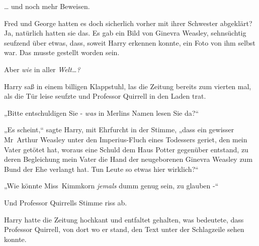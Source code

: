 … und noch mehr Beweisen.

Fred und George hatten es doch sicherlich vorher mit ihrer Schwester abgeklärt? Ja, natürlich hatten sie das. Es gab ein Bild von Ginevra Weasley, sehnsüchtig seufzend über etwas, dass, soweit Harry erkennen konnte, ein Foto von ihm selbst war. Das musste gestellt worden sein.

Aber \emph{wie} in aller \emph{Welt…?}

Harry saß in einem billigen Klappstuhl, las die Zeitung bereits zum vierten mal, als die Tür leise seufzte und Professor Quirrell in den Laden trat.

„Bitte entschuldigen Sie - \emph{was} in Merlins Namen lesen Sie da?“

„Es scheint,“ sagte Harry, mit Ehrfurcht in der Stimme, „dass ein gewisser Mr~Arthur Weasley unter den Imperius-Fluch eines Todessers geriet, den mein Vater getötet hat, woraus eine Schuld dem Haus Potter gegenüber entstand, zu deren Begleichung mein Vater die Hand der neugeborenen Ginevra Weasley zum Bund der Ehe verlangt hat. Tun Leute so etwas hier wirklich?“

„Wie könnte Miss~Kimmkorn \emph{jemals} dumm genug sein, zu glauben -“

Und Professor Quirrells Stimme riss ab.

Harry hatte die Zeitung hochkant und entfaltet gehalten, was bedeutete, dass Professor Quirrell, von dort wo er stand, den Text unter der Schlagzeile sehen konnte.

